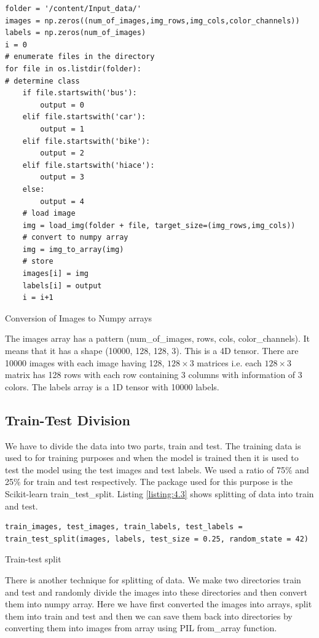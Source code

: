 \begin{longlisting}
    \begin{verbatim}
folder = '/content/Input_data/'
images = np.zeros((num_of_images,img_rows,img_cols,color_channels))
labels = np.zeros(num_of_images)
i = 0
# enumerate files in the directory
for file in os.listdir(folder):
# determine class
    if file.startswith('bus'):
        output = 0
    elif file.startswith('car'):
        output = 1
    elif file.startswith('bike'):
        output = 2
    elif file.startswith('hiace'):
        output = 3
    else:
        output = 4
    # load image
    img = load_img(folder + file, target_size=(img_rows,img_cols))
    # convert to numpy array
    img = img_to_array(img)
    # store
    images[i] = img
    labels[i] = output
    i = i+1
\end{verbatim}
\caption{Conversion of Images to Numpy arrays}
\label{listing:4.2}
\end{longlisting}
The images array has a pattern (num\_of\_images, rows, cols, color\_channels). It
means that it has a shape (10000, 128, 128, 3). This is a 4D tensor. There are 10000
images with each image having 128, $128\times 3$ matrices i.e. each $128\times 3$ matrix has
128 rows with each row containing 3 columns with information of 3 colors.
The labels array is a 1D tensor with 10000 labels.
\subsection{Train-Test Division}
We have to divide the data into two parts, train and test. The training data
is used to for training purposes and when the model is trained then it is
used to test the model using the test images and test labels. We used a ratio of 75\% and
25\% for train and test respectively. The package used for this purpose is the
Scikit-learn train\_test\_split. Listing \ref{listing:4.3} shows splitting of
data into train and test.

\begin{listing}[H]
    \begin{verbatim}
train_images, test_images, train_labels, test_labels = 
train_test_split(images, labels, test_size = 0.25, random_state = 42)
\end{verbatim}
\caption{Train-test split}
\label{listing:4.3}
\end{listing}
There is another technique for splitting of data. We make two directories
train and test and randomly divide the images into these directories and then
convert them into numpy array. Here we have first converted the images
into arrays, split them into train and test and then we can save them back into
directories by converting them into images from array using PIL from\_array
function.


